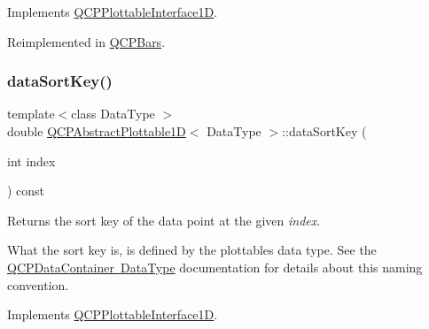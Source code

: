 Implements \mbox{\hyperlink{class_q_c_p_plottable_interface1_d_a78911838cfbcfd2d8df9ad2fdbfb8e93}{Q\+C\+P\+Plottable\+Interface1D}}.



Reimplemented in \mbox{\hyperlink{class_q_c_p_bars_a55cdaf565cd3384158d1f7f89533bc2d}{Q\+C\+P\+Bars}}.

\mbox{\label{class_q_c_p_abstract_plottable1_d_a6fce4e684f33a31c45928899b5d9ab4b}} 
\subsubsection{\texorpdfstring{data\+Sort\+Key()}{dataSortKey()}}
{\footnotesize\ttfamily template$<$class Data\+Type $>$ \\
double \mbox{\hyperlink{class_q_c_p_abstract_plottable1_d}{Q\+C\+P\+Abstract\+Plottable1D}}$<$ Data\+Type $>$\+::data\+Sort\+Key (\begin{DoxyParamCaption}\item[{int}]{index }\end{DoxyParamCaption}) const\hspace{0.3cm}{\ttfamily [virtual]}}





Returns the sort key of the data point at the given {\itshape index}.

What the sort key is, is defined by the plottable\textquotesingle{}s data type. See the \mbox{\hyperlink{class_q_c_p_data_container_qcpdatacontainer-datatype}{Q\+C\+P\+Data\+Container Data\+Type}} documentation for details about this naming convention. 

Implements \mbox{\hyperlink{class_q_c_p_plottable_interface1_d_afdc92f9f01e7e35f2e96b2ea9dc14ae7}{Q\+C\+P\+Plottable\+Interface1D}}.

\mbox{\label{class_q_c_p_abstract_plottable1_d_ac6201b01aee550ef0a240183781d1f9a}} 
